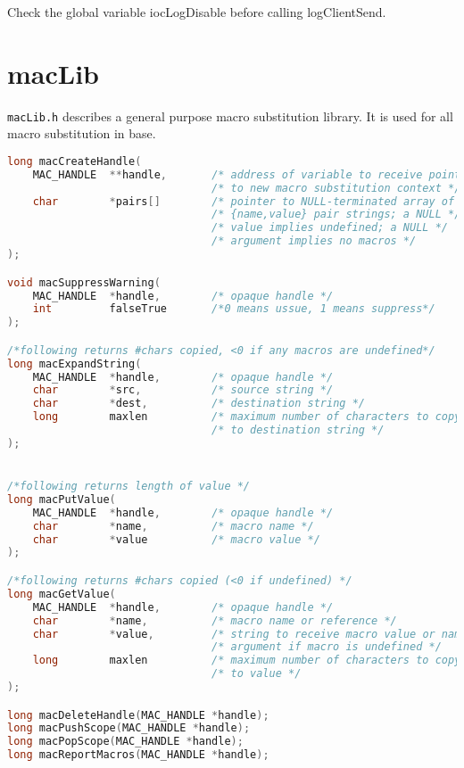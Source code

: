 Check the global variable iocLogDisable before calling logClientSend.

\section{macLib}

\verb|macLib.h| describes a general purpose macro substitution library.
It is used for all macro substitution in base.

\begin{lstlisting}[language=C]
long macCreateHandle(
    MAC_HANDLE  **handle,       /* address of variable to receive pointer */
                                /* to new macro substitution context */
    char        *pairs[]        /* pointer to NULL-terminated array of */
                                /* {name,value} pair strings; a NULL */
                                /* value implies undefined; a NULL */
                                /* argument implies no macros */
);

void macSuppressWarning(
    MAC_HANDLE  *handle,        /* opaque handle */
    int         falseTrue       /*0 means ussue, 1 means suppress*/
);

/*following returns #chars copied, <0 if any macros are undefined*/
long macExpandString(
    MAC_HANDLE  *handle,        /* opaque handle */
    char        *src,           /* source string */
    char        *dest,          /* destination string */
    long        maxlen          /* maximum number of characters to copy */
                                /* to destination string */
);


/*following returns length of value */
long macPutValue(
    MAC_HANDLE  *handle,        /* opaque handle */
    char        *name,          /* macro name */
    char        *value          /* macro value */
);

/*following returns #chars copied (<0 if undefined) */
long macGetValue(
    MAC_HANDLE  *handle,        /* opaque handle */
    char        *name,          /* macro name or reference */
    char        *value,         /* string to receive macro value or name */
                                /* argument if macro is undefined */
    long        maxlen          /* maximum number of characters to copy */
                                /* to value */
);

long macDeleteHandle(MAC_HANDLE *handle);
long macPushScope(MAC_HANDLE *handle);
long macPopScope(MAC_HANDLE *handle);
long macReportMacros(MAC_HANDLE *handle);


\end{lstlisting}
